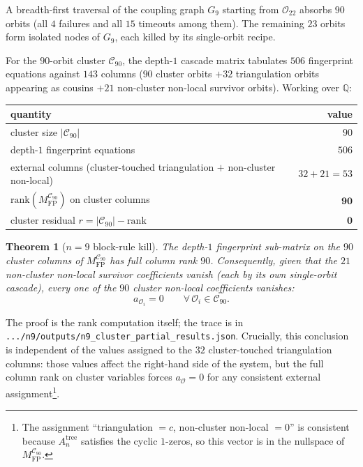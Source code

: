 \documentclass[11pt]{article}
\newtheorem{thm}{Theorem}
\theoremstyle{definition}
\begin{document}
A breadth-first traversal of the coupling graph $G_9$ starting
from $\mathcal O_{22}$ absorbs $90$ orbits (all $4$ failures and
all $15$ timeouts among them). The remaining $23$ orbits form
isolated nodes of $G_9$, each killed by its single-orbit recipe.

For the $90$-orbit cluster $\mathcal C_{90}$, the depth-$1$
cascade matrix tabulates $506$ fingerprint equations against
$143$ columns ($90$ cluster orbits $+ 32$ triangulation orbits
appearing as cousins $+ 21$ non-cluster non-local survivor
orbits). Working over $\mathbb Q$:

\begin{center}\small
\begin{tabular}{lr}
\toprule
quantity & value\\
\midrule
cluster size $|\mathcal C_{90}|$ & $90$\\
depth-$1$ fingerprint equations & $506$\\
external columns (cluster-touched triangulation $+$ non-cluster non-local) & $32+21=53$\\
$\mathrm{rank}(M_{\mathrm{FP}}^{\mathcal C_{90}})$ on cluster columns & $\boldsymbol{90}$\\
cluster residual $r=|\mathcal C_{90}|-\mathrm{rank}$ & $\boldsymbol{0}$\\
\bottomrule
\end{tabular}
\end{center}

\begin{thm}[$n=9$ block-rule kill]\label{thm:n9-kill}
The depth-$1$ fingerprint sub-matrix on the $90$ cluster columns
of $M_{\mathrm{FP}}^{\mathcal C_{90}}$ has full column rank $90$.
Consequently, given that the $21$ non-cluster non-local survivor
coefficients vanish (each by its own single-orbit cascade), every
one of the $90$ cluster non-local coefficients vanishes:
\[
   a_{\mathcal O_i}=0 \qquad\forall\,\mathcal O_i\in\mathcal C_{90}.
\]
\end{thm}

The proof is the rank computation itself; the trace is in
\verb|.../n9/outputs/n9_cluster_partial_results.json|. Crucially,
this conclusion is independent of the values assigned to the $32$
cluster-touched triangulation columns: those values affect the
right-hand side of the system, but the full column rank on cluster
variables forces $a_{\mathcal O}=0$ for any consistent external
assignment\footnote{The assignment ``triangulation $=c$, non-cluster
non-local $=0$'' is consistent because $A_n^{\mathrm{tree}}$
satisfies the cyclic $1$-zeros, so this vector is in the
nullspace of $M_{\mathrm{FP}}^{\mathcal C_{90}}$.}.
\end{document}
